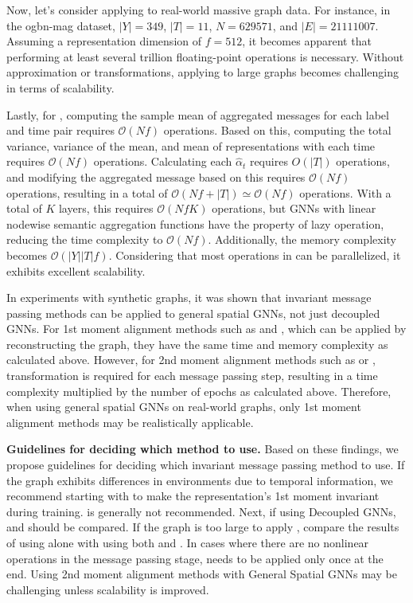 Now, let's consider applying \PNY to real-world massive graph data. For instance, in the ogbn-mag dataset, $|Y|=349$, $|T|=11$, $N=629571$, and $|E|=21111007$. Assuming a representation dimension of $f=512$, it becomes apparent that performing at least several trillion floating-point operations is necessary. Without approximation or transformations, applying \PNY to large graphs becomes challenging in terms of scalability.

Lastly, for \JJnorm, computing the sample mean of aggregated messages for each label and time pair requires $\mathcal{O}(Nf)$ operations. Based on this, computing the total variance, variance of the mean, and mean of representations with each time requires $\mathcal{O}(Nf)$ operations. Calculating each $\hat\alpha_t$ requires $O(|T|)$ operations, and modifying the aggregated message based on this requires $\mathcal{O}(Nf)$ operations, resulting in a total of $\mathcal{O}(Nf+|T|) \simeq \mathcal{O}(Nf)$ operations. With a total of $K$ layers, this requires $\mathcal{O}(NfK)$ operations, but GNNs with linear nodewise semantic aggregation functions have the property of lazy operation, reducing the time complexity to $\mathcal{O}(Nf)$. Additionally, the memory complexity becomes $\mathcal{O}(|Y||T|f)$. Considering that most operations in \JJnorm can be parallelized, it exhibits excellent scalability.

In experiments with synthetic graphs, it was shown that invariant message passing methods can be applied to general spatial GNNs, not just decoupled GNNs. For 1st moment alignment methods such as \PMP and \MMP, which can be applied by reconstructing the graph, they have the same time and memory complexity as calculated above. However, for 2nd moment alignment methods such as \JJnorm or \PNY, transformation is required for each message passing step, resulting in a time complexity multiplied by the number of epochs as calculated above. Therefore, when using general spatial GNNs on real-world graphs, only 1st moment alignment methods may be realistically applicable.

\textbf{Guidelines for deciding which \IMPaCT method to use.} Based on these findings, we propose guidelines for deciding which invariant message passing method to use. If the graph exhibits differences in environments due to temporal information, we recommend starting with \PMP to make the representation's 1st moment invariant during training. \MMP is generally not recommended. Next, if using Decoupled GNNs, \PNY and \JJnorm should be compared. If the graph is too large to apply \PNY, compare the results of using \PMP alone with using both \PMP and \JJnorm. In cases where there are no nonlinear operations in the message passing stage, \JJnorm needs to be applied only once at the end. Using 2nd moment alignment methods with General Spatial GNNs may be challenging unless scalability is improved.

